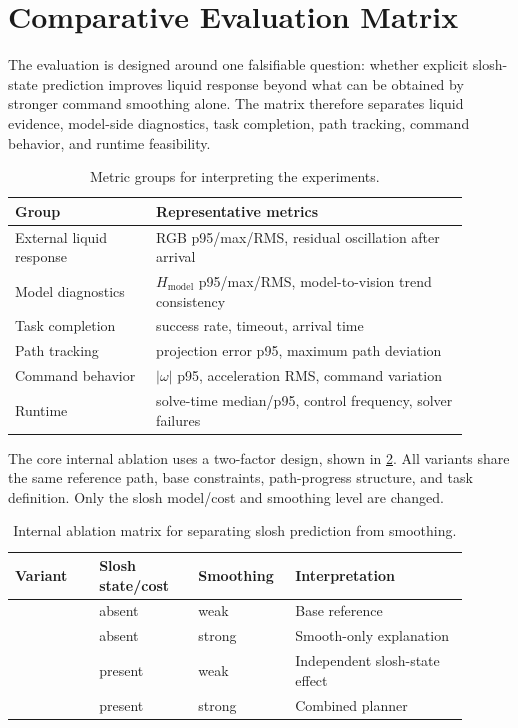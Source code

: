 \section{Comparative Evaluation Matrix}

The evaluation is designed around one falsifiable question: whether explicit slosh-state prediction improves liquid response beyond what can be obtained by stronger command smoothing alone.
The matrix therefore separates liquid evidence, model-side diagnostics, task completion, path tracking, command behavior, and runtime feasibility.

\begin{table}[t]
  \centering
  \scriptsize
  \setlength{\tabcolsep}{3pt}
  \caption{Metric groups for interpreting the experiments.}
  \label{tab:method_metric_groups}
  \begin{tabular}{p{0.28\linewidth} p{0.62\linewidth}}
    \toprule
    Group & Representative metrics \\
    \midrule
    External liquid response & RGB p95/max/RMS, residual oscillation after arrival \\
    Model diagnostics & $H_{\mathrm{model}}$ p95/max/RMS, model-to-vision trend consistency \\
    Task completion & success rate, timeout, arrival time \\
    Path tracking & projection error p95, maximum path deviation \\
    Command behavior & $|\omega|$ p95, acceleration RMS, command variation \\
    Runtime & solve-time median/p95, control frequency, solver failures \\
    \bottomrule
  \end{tabular}
\end{table}

The core internal ablation uses a two-factor design, shown in \cref{tab:method_internal_ablation}.
All variants share the same reference path, base constraints, path-progress \MPCC{} structure, and task definition.
Only the slosh model/cost and smoothing level are changed.

\begin{table}[t]
  \centering
  \scriptsize
  \setlength{\tabcolsep}{3pt}
  \caption{Internal ablation matrix for separating slosh prediction from smoothing.}
  \label{tab:method_internal_ablation}
  \begin{tabular}{p{0.17\linewidth} p{0.20\linewidth} p{0.18\linewidth} p{0.35\linewidth}}
    \toprule
    Variant & Slosh state/cost & Smoothing & Interpretation \\
    \midrule
    \Bzero{} & absent & weak & Base \MPCC{} reference \\
    \Bsmooth{} & absent & strong & Smooth-only explanation \\
    \Bslosh{} & present & weak & Independent slosh-state effect \\
    \Bours{} & present & strong & Combined \SPMPC{} planner \\
    \bottomrule
  \end{tabular}
\end{table}

